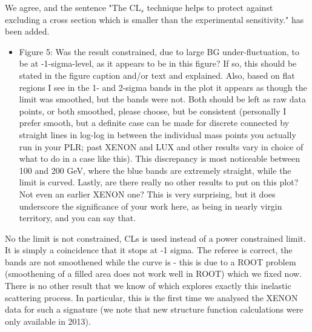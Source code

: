 \documentclass{article}
\begin{document}
We agree, and the sentence   "The CL$_s$ technique helps to protect against excluding  a cross section which is smaller than the experimental sensitivity."  has been added.



\begin{itemize}
	\item {\color{blue} 
Figure 5: Was the result constrained, due to large BG
under-fluctuation, to be at -1-sigma-level, as it appears to be in
this figure? If so, this should be stated in the figure caption and/or
text and explained. Also, based on flat regions I see in the 1- and
2-sigma bands in the plot it appears as though the limit was smoothed,
but the bands were not. Both should be left as raw data points, or
both smoothed, please choose, but be consistent (personally I prefer
smooth, but a definite case can be made for discrete connected by
straight lines in log-log in between the individual mass points you
actually run in your PLR; past XENON and LUX and other results vary in
choice of what to do in a case like this). This discrepancy is most
noticeable between 100 and 200 GeV, where the blue bands are extremely
straight, while the limit is curved. Lastly, are there really no other
results to put on this plot? Not even an earlier XENON one? This is
very surprising, but it does underscore the significance of your work
here, as being in nearly virgin territory, and you can say that.}
\end{itemize}

No the limit is not constrained, CLs is used instead of a power constrained limit.
It is simply a coincidence that it stops at -1 sigma.
The referee is correct, the bands are not smoothened while the curve is -  this is due to a ROOT 
problem (smoothening of a filled area does not work well in ROOT) which we  
fixed now. 
There is no other result that we know of which explores 
exactly this inelastic scattering process. In particular, this is the first time we analysed the XENON data for 
such a signature (we note that new structure function calculations were only available in 2013).
\end{document}
